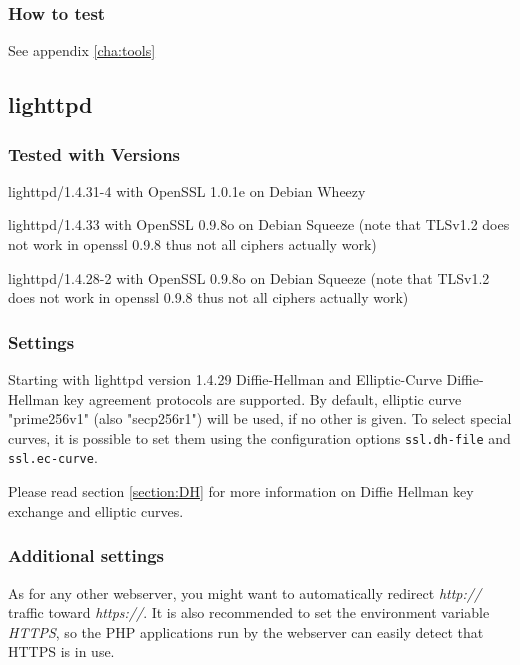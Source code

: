 \subsubsection{How to test}
See appendix \ref{cha:tools}


\subsection{lighttpd}

\subsubsection{Tested with Versions}
\begin{itemize*}
  \item lighttpd/1.4.31-4 with OpenSSL 1.0.1e on Debian Wheezy
  \item lighttpd/1.4.33 with OpenSSL 0.9.8o on Debian Squeeze (note that TLSv1.2 does not work in openssl 0.9.8 thus not all ciphers actually work)
  \item lighttpd/1.4.28-2 with OpenSSL 0.9.8o on Debian Squeeze (note that TLSv1.2 does not work in openssl 0.9.8 thus not all ciphers actually work)
\end{itemize*}


\subsubsection{Settings}

Starting with lighttpd version 1.4.29 Diffie-Hellman and Elliptic-Curve Diffie-Hellman key agreement protocols are supported.
By default, elliptic curve "prime256v1" (also "secp256r1") will be used, if no other is given.
To select special curves, it is possible to set them using the configuration options \verb|ssl.dh-file| and \verb|ssl.ec-curve|.


Please read section \ref{section:DH} for more information on Diffie Hellman key exchange and elliptic curves.

\subsubsection{Additional settings}
As for any other webserver, you might want to automatically redirect \emph{http://}
traffic toward \emph{https://}. It is also recommended to set the environment variable
\emph{HTTPS}, so the PHP applications run by the webserver can easily detect
that HTTPS is in use.

